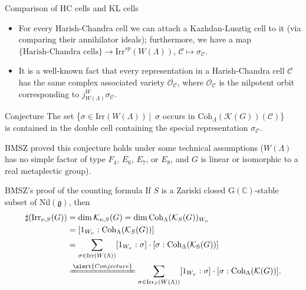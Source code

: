 \documentclass[fleqn,xcolor=dvipsnames]{beamer}
\newcommand{\BC}{{\mathbb {C}}}
\newcommand{\CC}{{\mathcal {C}}}
\newcommand{\CK}{{\mathcal {K}}}
\newcommand{\CO}{{\mathcal {O}}}
\newcommand{\RG}{{\mathrm {G}}}
\newcommand{\RS}{{\mathrm {S}}}
\newcommand{\fg}{\mathfrak{g}}
\newcommand{\Irr}{{\mathrm{Irr}}}
\newcommand{\Nil}{{\mathrm{Nil}}}
\newcommand{\set}[2]{\{#1\,|\,#2\}}
\renewcommand{\bar}{\overline}
\begin{document}
\begin{frame}{Comparison of HC cells and KL cells}
  \begin{itemize}
    \item For every Harish-Chandra cell we can attach a Kazhdan-Lusztig cell to it (via comparing their annihilator ideals); furthermore, we have a map $\{\textrm{Harish-Chandra  cells}\} \to \Irr^{sp}(W(\Lambda))$, $\CC \mapsto \sigma_{\CC}$.
  \pause\item It is a well-known fact that every representation in a Harish-Chandra cell $\CC$ has the \alert{same complex associated variety} $\bar{\CO_{\CC}}$, where $\CO_{\CC}$ is the nilpotent orbit corresponding to $j_{W(\Lambda)}^{W}\sigma_{\CC}$.
  \end{itemize}
  \pause\begin{block}{Conjecture}
    The set \set{$\sigma \in \Irr(W(\Lambda))$}{ \textrm{$\sigma$ occurs in $\mathrm{Coh}_{\Lambda}(\CK(G))(\CC)$}}\\[3pt] is contained in the double cell containing the special representation $\sigma_{\CC}$.
  \end{block}
  \pause BMSZ proved this conjecture holds under some technical assumptions ($W(\Lambda)$ has no simple factor of type $F_4$, $E_6$, $E_7$, or $E_8$, and $G$ is linear or isomorphic to a real metaplectic group).
\end{frame}



\begin{frame}{BMSZ's proof of the counting formula}
  If $S$ is a Zariski closed $\RG(\BC)$-stable subset of $\Nil(\fg)$, then
  \begin{align*}
    \sharp(\Irr_{\nu,S}(G)) &= \dim \CK_{\nu,S}(G) = \dim \mathrm{Coh}_{\Lambda}(\CK_{S}(G))_{W_\nu} \\
    & = [1_{W_{\nu}}:\mathrm{Coh}_{\Lambda}(\CK_{S}(G))] \\
    & = \sum_{\sigma \in \Irr(W(\Lambda))} [1_{W_\nu}:\sigma] \cdot [\sigma:\mathrm{Coh}_{\Lambda}(\CK_{\RS}(G))]\\
    & \xlongequal{\alert{Conjecture}} \sum_{\sigma \in \Irr_{S}(W(\Lambda))} [1_{W_\nu}:\sigma] \cdot [\sigma:\mathrm{Coh}_{\Lambda}(\CK(G))].
  \end{align*}
\end{frame}
\end{document}
